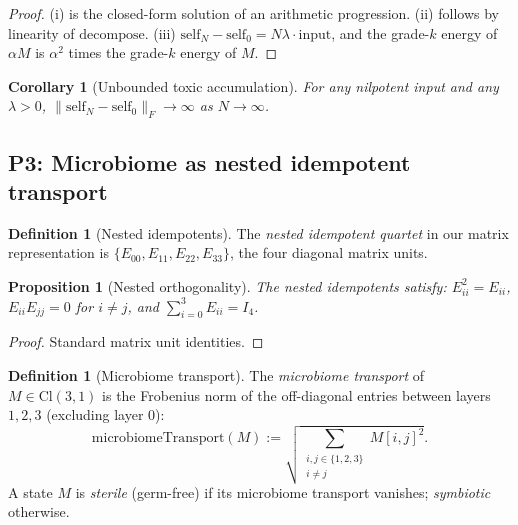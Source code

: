 \documentclass[11pt,a4paper]{article}
\theoremstyle{plain}
\newtheorem{proposition}[theorem]{Proposition}
\newtheorem{corollary}[theorem]{Corollary}
\theoremstyle{definition}
\newtheorem{definition}[theorem]{Definition}
\theoremstyle{remark}
\numberwithin{equation}{section}
\providecommand{\Cl}{\mathrm{Cl}}
\begin{document}
\begin{proof}
(i) is the closed-form solution of an arithmetic progression.
(ii) follows by linearity of $\mathrm{decompose}$. (iii)
$\mathrm{self}_N - \mathrm{self}_0 = N \lambda \cdot \mathrm{input}$,
and the grade-$k$ energy of $\alpha M$ is $\alpha^2$ times the
grade-$k$ energy of $M$.
\end{proof}

\begin{corollary}[Unbounded toxic accumulation]
\label{cor:immunodef-unbounded}
For any nilpotent input and any $\lambda > 0$,
$\|\mathrm{self}_N - \mathrm{self}_0\|_F \to \infty$ as $N \to \infty$.
\end{corollary}

\subsection{P3: Microbiome as nested idempotent transport}

\begin{definition}[Nested idempotents]
\label{def:nested}
The \emph{nested idempotent quartet} in our matrix representation is
$\{E_{00}, E_{11}, E_{22}, E_{33}\}$, the four diagonal matrix
units.
\end{definition}

\begin{proposition}[Nested orthogonality]
\label{prop:nested-orth}
The nested idempotents satisfy: $E_{ii}^2 = E_{ii}$, $E_{ii} E_{jj} = 0$ for
$i \ne j$, and $\sum_{i=0}^{3} E_{ii} = I_4$.
\end{proposition}

\begin{proof}
Standard matrix unit identities.
\end{proof}

\begin{definition}[Microbiome transport]
\label{def:micro}
The \emph{microbiome transport} of $M \in \Cl(3,1)$ is the
Frobenius norm of the off-diagonal entries between layers
$1, 2, 3$ (excluding layer $0$):
\[
\mathrm{microbiomeTransport}(M) := \sqrt{\sum_{\substack{i, j \in \{1,2,3\} \\ i \ne j}} M[i,j]^2}.
\]
A state $M$ is \emph{sterile} (germ-free) if its microbiome
transport vanishes; \emph{symbiotic} otherwise.
\end{definition}
\end{document}
